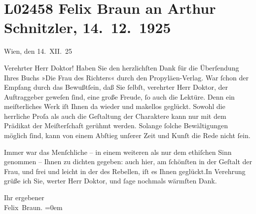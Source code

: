 

\section[Felix Braun an Arthur Schnitzler, 14. 12. 1925]{L02458 Felix Braun an Arthur Schnitzler, 14. 12. 1925}
\nopagebreak{}
\rehead{ }\normalsize\beginnumbering{}
\toendnotes[C]{\smallbreak\pagebreak[2]}
\toendnotes[C]{\smallbreak}
\pstart
           \centering{}{\pb}Wien, den 14. XII. 25\pend
           
\pstart{}Verehrter Herr Doktor!\pend\vspace{0.5em}
\pstart
           Haben Sie den herzlichſten Dank für die Überſendung Ihres Buchs »Die Frau des Richters« durch den Propyläen-Verlag. War ſchon der Empfang durch das Bewußtſein, daß Sie
               ſelbſt, verehrter Herr Doktor, der Auftraggeber geweſen ſind, eine große Freude, ſo
               auch die Lektüre. Denn ein meiſterliches Werk iſt Ihnen da wieder und makellos
               geglückt. Sowohl die herrliche Proſa als auch die Geſtaltung der Charaktere kann nur
               mit dem Prädikat der Meiſter{\pb}ſchaft gerühmt werden.
               Solange ſolche Bewältigungen möglich ſind, kann von einem Abſtieg unſerer Zeit und
               Kunſt die Rede nicht ſein.\pend
           
\pstart
           Immer war das Menſchliche – in einem weiteren als nur dem ethiſchen Sinn genommen –
               Ihnen zu dichten gegeben: auch hier, am ſchönſten in der Geſtalt der Frau, und frei und leicht in der des Rebellen, iſt es Ihnen
                  geglückt.\hspace*{1.5em}In Verehrung grüße ich Sie, werter Herr
               Doktor, und ſage nochmals wärmſten Dank.\pend
           
\pstart
           Ihr ergebener{\\[\baselineskip]}\spacefill\mbox{Felix Braun.}\pend
           \leftskip=0em{}\endnumbering{}  
      